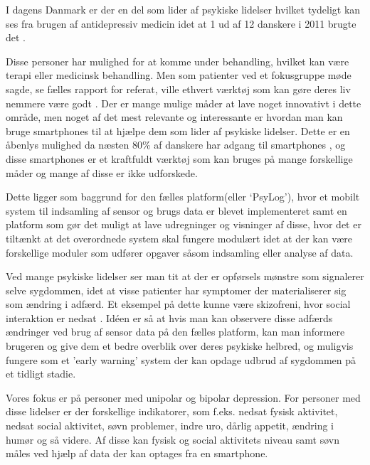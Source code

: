 I dagens Danmark er der en del som lider af psykiske lidelser hvilket tydeligt kan ses fra brugen af antidepressiv medicin idet at 1 ud af 12 danskere i 2011 brugte det \citep{misc:forbrugAntidepressiva}. 

Disse personer har mulighed for at komme under behandling, hvilket kan være terapi eller medicinsk behandling.
Men som patienter ved et fokusgruppe møde sagde, se fælles rapport for referat\citep{misc:faellesrapp}, ville ethvert værktøj som kan gøre deres liv nemmere være godt .
Der er mange mulige måder at lave noget innovativt i dette område, men noget af det mest relevante og interessante er hvordan man kan bruge smartphones til at hjælpe dem som lider af psykiske lidelser.
Dette er en åbenlys mulighed da næsten 80\% af danskere har adgang til smartphones \citep{misc:dstElektronik}, og disse smartphones er et kraftfuldt værktøj som kan bruges på mange forskellige måder og mange af disse er ikke udforskede.

Dette ligger som baggrund for den fælles platform(eller `PsyLog')\citep{misc:faellesrapp}, hvor et mobilt system til indsamling af sensor og brugs data er blevet implementeret samt en platform som gør det muligt at lave udregninger og visninger af disse, hvor det er tiltænkt at det overordnede system skal fungere modulært idet at der kan være forskellige moduler som udfører opgaver såsom indsamling eller analyse af data.

Ved mange psykiske lidelser ser man tit at der er opførsels mønstre som signalerer selve sygdommen, idet at visse patienter har symptomer der materialiserer sig som ændring i adfærd.
Et eksempel på dette kunne være skizofreni, hvor social interaktion er nedsat \citep{misc:negativeSymptomsSchizo}.
Idéen er så at hvis man kan observere disse adfærds ændringer ved brug af sensor data på den fælles platform, kan man informere brugeren og give dem et bedre overblik over deres psykiske helbred, og muligvis fungere som et 'early warning' system der kan opdage udbrud af sygdommen på et tidligt stadie.

Vores fokus er på personer med unipolar og bipolar depression. 
For personer med disse lidelser er der forskellige indikatorer, som f.eks. nedsat fysisk aktivitet, nedsat social aktivitet, søvn problemer, indre uro, dårlig appetit, ændring i humør og så videre\citep{misc:faellesrapp}.
Af disse kan fysisk og social aktivitets niveau samt søvn måles ved hjælp af data der kan optages fra en smartphone.

